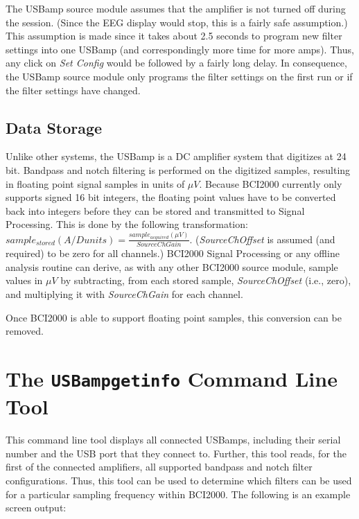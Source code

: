 \documentclass[letterpaper, oneside, 12pt]{article}
\begin{document}
The USBamp source module assumes that the amplifier is not turned off during the 
session. (Since the EEG display would stop, this is a fairly safe assumption.) 
This assumption is made since it takes about 2.5 seconds to program new filter 
settings into one USBamp (and correspondingly more time for more amps). Thus, 
any click on \emph{Set Config} would be followed by a fairly long delay. In 
consequence, the USBamp source module only programs the filter settings on the 
first run or if the filter settings have changed.

\subsection{Data Storage}

Unlike other systems, the USBamp is a DC amplifier system that digitizes at 24 
bit. Bandpass and notch filtering is performed on the digitized samples, 
resulting in floating point signal samples in units of $\mu V$. Because BCI2000 
currently only supports signed 16 bit integers, the floating point values have 
to be converted back into integers before they can be stored and transmitted to 
Signal Processing. This is done by the following transformation: 
$sample_{stored}(A/D units)=\frac{sample_{acquired}(\mu V)}{SourceChGain}$. 
(\emph{SourceChOffset} is assumed (and required) to be zero for all channels.) 
BCI2000 Signal Processing or any offline analysis routine can derive, as with 
any other BCI2000 source module, sample values in $\mu V$ by subtracting, from 
each stored sample, \emph{SourceChOffset} (i.e., zero), and multiplying it with 
\emph{SourceChGain} for each channel.

Once BCI2000 is able to support floating point samples, this conversion can be 
removed.

\section{The \texttt{USBampgetinfo} Command Line Tool}

This command line tool displays all connected USBamps, including their serial 
number and the USB port that they connect to. Further, this tool reads, for the 
first of the connected amplifiers, all supported bandpass and notch filter 
configurations. Thus, this tool can be used to determine which filters can be 
used for a particular sampling frequency within BCI2000. The following is an 
example screen output:
\end{document}
